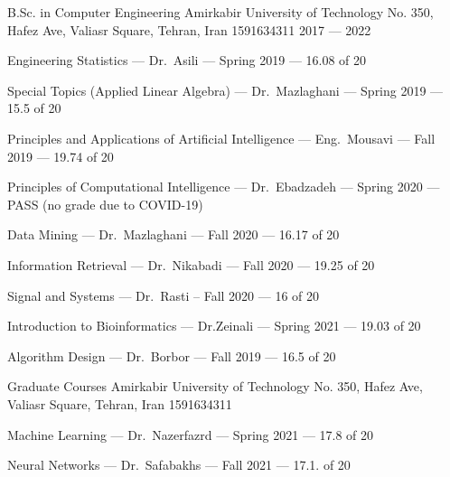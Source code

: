

\begin{cventries}

  \cventry
    {B.Sc. in Computer Engineering} %
    {Amirkabir University of Technology} %
    {No. 350, Hafez Ave, Valiasr Square, Tehran, Iran 1591634311} %
    {2017 --- 2022} %
    {
        \begin{cvitems}
            \item Engineering Statistics --- Dr.~Asili --- Spring 2019 --- 16.08 of 20
            \item Special Topics (Applied Linear Algebra) --- Dr.~Mazlaghani --- Spring 2019 --- 15.5 of 20
            \item Principles and Applications of Artificial Intelligence --- Eng.~Mousavi --- Fall 2019 --- 19.74 of 20
            \item Principles of Computational Intelligence --- Dr.~Ebadzadeh --- Spring 2020 --- PASS (no grade due to COVID-19)
            \item Data Mining --- Dr.~Mazlaghani --- Fall 2020 --- 16.17 of 20
            \item Information Retrieval --- Dr.~Nikabadi --- Fall 2020 --- 19.25 of 20
            \item Signal and Systems --- Dr.~Rasti -- Fall 2020 --- 16 of 20
            \item Introduction to Bioinformatics --- Dr.Zeinali --- Spring 2021 --- 19.03 of 20
            \item Algorithm Design --- Dr.~Borbor --- Fall 2019 --- 16.5 of 20
        \end{cvitems}
    }

    \cventry
    {Graduate Courses} %
    {Amirkabir University of Technology} %
    {No. 350, Hafez Ave, Valiasr Square, Tehran, Iran 1591634311} %
    {} %
    {
        \begin{cvitems}
          \item Machine Learning --- Dr.~Nazerfazrd --- Spring 2021 --- 17.8 of 20
          \item Neural Networks --- Dr.~Safabakhs --- Fall 2021 --- 17.1. of 20
        \end{cvitems}
    }

\end{cventries}
